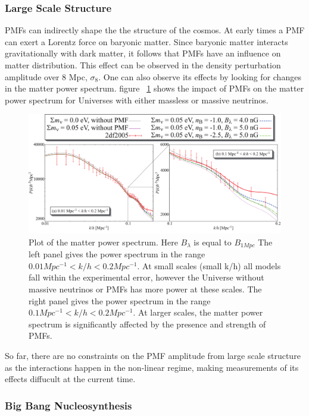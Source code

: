 \subsubsection{Large Scale Structure}

PMFs can indirectly shape the the structure of the cosmos. At early times a PMF can exert a Lorentz force on baryonic matter. Since baryonic matter interacts gravitationally with dark matter, it follows that PMFs have an influence on matter distribution. This effect can be observed in the density perturbation amplitude over 8 Mpc, $\sigma_8$. One can also observe its effects by looking for changes in the matter power spectrum. figure ~\ref{fig:matterpower} shows the impact of PMFs on the matter power spectrum for Universes with either massless or massive neutrinos.

\begin{figure}[ht]
\centering
\includegraphics[scale=1.1]{images/matterpower.png} 
\caption{Plot of the matter power spectrum. Here $B_{\lambda}$ is equal to $B_{1Mpc}$ The left panel gives the power spectrum in the range $0.01 Mpc^{-1} < k/h < 0.2 Mpc^{-1}$. At small scales (small k/h) all models fall within the experimental error, however the Universe without massive neutrinos or PMFs has more power at these scales. The right panel gives the power spectrum in the range $0.1 Mpc^{-1} < k/h < 0.2 Mpc^{-1}$. At larger scales, the matter power spectrum is significantly affected by the presence and strength of PMFs.}
\label{fig:matterpower}
\end{figure}

So far, there are no constraints on the PMF amplitude from large scale structure as the interactions happen in the non-linear regime, making measurements of its effects diffucult at the current time.


\subsubsection{Big Bang Nucleosynthesis}

